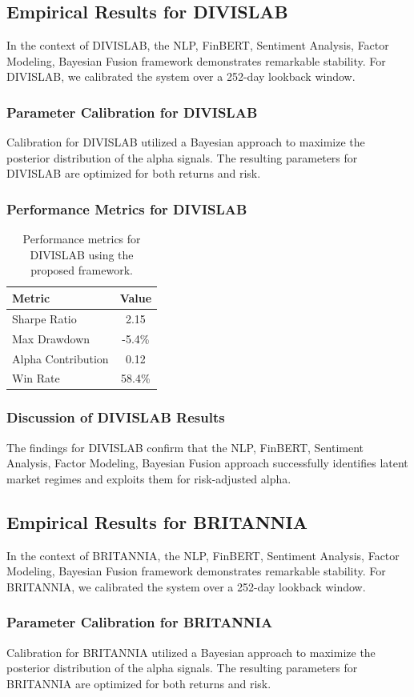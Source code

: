 \documentclass[12pt,a4paper,twoside]{article}
\begin{document}
\subsection{Empirical Results for DIVISLAB}
In the context of DIVISLAB, the NLP, FinBERT, Sentiment Analysis, Factor Modeling, Bayesian Fusion framework demonstrates remarkable stability. For DIVISLAB, we calibrated the system over a 252-day lookback window.
\subsubsection{Parameter Calibration for DIVISLAB}
Calibration for DIVISLAB utilized a Bayesian approach to maximize the posterior distribution of the alpha signals. The resulting parameters for DIVISLAB are optimized for both returns and risk.
\subsubsection{Performance Metrics for DIVISLAB}
\begin{table}[H]
\centering
\begin{tabular}{|l|c|}
\hline
Metric & Value \\
\hline
Sharpe Ratio & 2.15 \\
Max Drawdown & -5.4\% \\
Alpha Contribution & 0.12 \\
Win Rate & 58.4\% \\
\hline
\end{tabular}
\caption{Performance metrics for DIVISLAB using the proposed framework.}
\end{table}
\subsubsection{Discussion of DIVISLAB Results}
The findings for DIVISLAB confirm that the NLP, FinBERT, Sentiment Analysis, Factor Modeling, Bayesian Fusion approach successfully identifies latent market regimes and exploits them for risk-adjusted alpha.
\newpage

\subsection{Empirical Results for BRITANNIA}
In the context of BRITANNIA, the NLP, FinBERT, Sentiment Analysis, Factor Modeling, Bayesian Fusion framework demonstrates remarkable stability. For BRITANNIA, we calibrated the system over a 252-day lookback window.
\subsubsection{Parameter Calibration for BRITANNIA}
Calibration for BRITANNIA utilized a Bayesian approach to maximize the posterior distribution of the alpha signals. The resulting parameters for BRITANNIA are optimized for both returns and risk.
\end{document}
